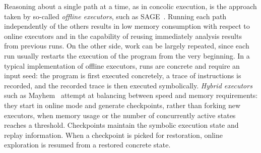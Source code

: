 Reasoning about a single path at a time, as in concolic execution, is the approach taken by so-called {\em offline executors}, such as {\textsc SAGE}~\cite{SAGE-NDSS08}. Running each path independently of the others results in low memory consumption with respect to online executors and in the capability of reusing immediately analysis results from previous runs. On the other side, work can be largely repeated, since each run usually restarts the execution of the program from the very beginning. In a typical implementation of offline executors, runs are concrete and require an input seed: the program is first executed concretely, a trace of instructions is recorded, and the recorded trace is then executed symbolically.
%
{\em Hybrid executors} such as {\textsc Mayhem}~\cite{MAYHEM-SP12} attempt at balancing between speed and memory requirements: they start in online mode and generate checkpoints, rather than forking new executors, when memory usage or the number of concurrently active states reaches a threshold. Checkpoints maintain the symbolic execution state and replay information. When a checkpoint is picked for restoration, online exploration is resumed from a restored concrete state.
